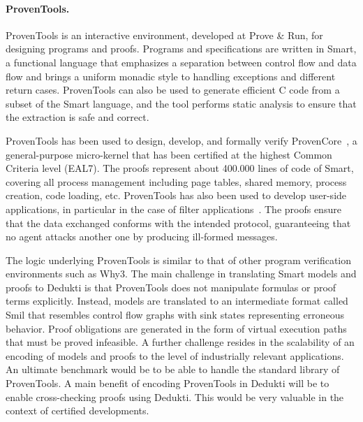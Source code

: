 \paragraph*{ProvenTools.}
ProvenTools is an interactive environment, developed at Prove \& Run,
for designing programs and proofs. Programs and specifications are
written in Smart, a functional language that emphasizes a separation
between control flow and data flow and brings a uniform monadic style
to handling exceptions and different return cases.
ProvenTools can also be used to generate efficient C code from a subset
of the Smart language, and the tool performs static analysis to ensure
that the extraction is safe and correct.

ProvenTools has been used to design, develop, and formally verify
ProvenCore~\cite{lescuyer:provencore}, a general-purpose micro-kernel that has
been certified at the highest Common Criteria level (EAL7). The proofs represent
about 400.000 lines of code of Smart, covering all process management including page
tables, shared memory, process creation, code loading, etc. ProvenTools has also
been used to develop user-side applications, in particular in the case of filter
applications~\cite{bolignano:security}. The proofs ensure that the data
exchanged conforms with the intended protocol, guaranteeing that no agent
attacks another one by producing ill-formed messages.

The logic underlying ProvenTools is similar to that of other program
verification environments such as Why3. The main challenge in translating
Smart models and proofs to Dedukti is that ProvenTools does not
manipulate formulas or proof terms explicitly. Instead, models are translated to
an intermediate format called Smil that resembles control flow graphs
with sink states representing erroneous behavior. Proof obligations are
generated in the form of virtual execution paths that must be proved infeasible.
A further challenge resides in the scalability of an encoding of models and
proofs to the level of industrially relevant applications. An ultimate benchmark
would be to be able to handle the standard library of ProvenTools. A main
benefit of encoding ProvenTools in Dedukti will be to enable cross-checking
proofs using Dedukti. This would be very valuable in the context of certified
developments.

